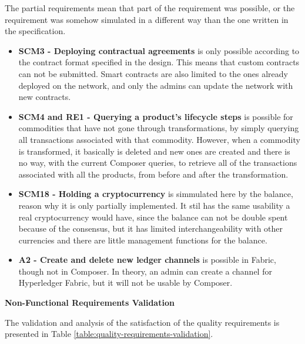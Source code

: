 The partial requirements mean that part of the requirement was possible, or the requirement was somehow simulated in a different way than the one written in the specification.

\begin{itemize}
	\item \textbf{SCM3 - Deploying contractual agreements} is only possible according to the contract format specified in the design. This means that custom contracts can not be submitted. Smart contracts are also limited to the ones already deployed on the network, and only the admins can update the network with new contracts.
	\item \textbf{SCM4 and RE1 - Querying a product's lifecycle steps} is possible for commodities that have not gone through transformations, by simply querying all transactions associated with that commodity. However, when a commodity is transformed, it basically is deleted and new ones are created and there is no way, with the current Composer queries, to retrieve all of the transactions associated with all the products, from before and after the transformation.
	\item \textbf{SCM18 - Holding a cryptocurrency} is simmulated here by the balance, reason why it is only partially implemented. It stil has the same usability a real cryptocurrency would have, since the balance can not be double spent because of the consensus, but it has limited interchangeability with other currencies and there are little management functions for the balance.
	\item \textbf{A2 - Create and delete new ledger channels} is possible in Fabric, though not in Composer. In theory, an admin can create a channel for Hyperledger Fabric, but it will not be usable by Composer.
\end{itemize}

\par \textbf{Non-Functional Requirements Validation}

The validation and analysis of the satisfaction of the quality requirements is presented in Table \ref{table:quality-requirements-validation}.

